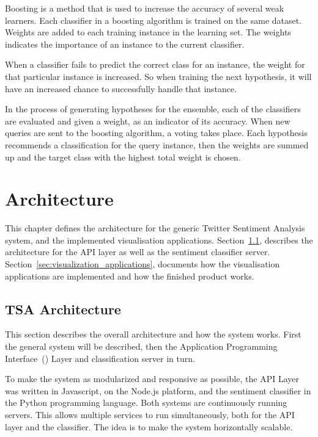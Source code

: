 Boosting is a method that is used to increase the accuracy of several weak learners. Each classifier in a boosting algorithm is trained on the same dataset. Weights are added to each training instance in the learning set. The weights indicates the importance of an instance to the current classifier. 

When a classifier fails to predict the correct class for an instance, the weight for that particular instance is increased. So when training the next hypothesis, it will have an increased chance to successfully handle that instance.

In the process of generating hypotheses for the ensemble, each of the classifiers are evaluated and given a weight, as an indicator of its accuracy. When new queries are sent to the boosting algorithm, a voting takes place. Each hypothesis recommends a classification for the query instance, then the weights are summed up and the target class with the highest total weight is chosen.

\chapter{Architecture}
\label{sec:experimentalsetup}

This chapter defines the architecture for the generic Twitter Sentiment Analysis system, and the implemented visualisation applications. Section~\ref{sec:tsaarchitecture}, describes the architecture for the API layer as well as the sentiment classifier server. Section~\ref{sec:visualization_applications}, documents how the visualisation applications are implemented and how the finished product works.

\section{TSA Architecture}
\label{sec:tsaarchitecture}

This section describes the overall architecture and how the system works. First the general system will be described, then the Application Programming Interface~() Layer and classification server in turn.  

To make the system as modularized and responsive as possible, the API Layer was written in Javascript, on the Node.js platform, and the sentiment classifier in the Python programming language. Both systems are continuously running servers. This allows multiple services to run simultaneously, both for the API layer and the classifier. The idea is to make the system horizontally scalable.

